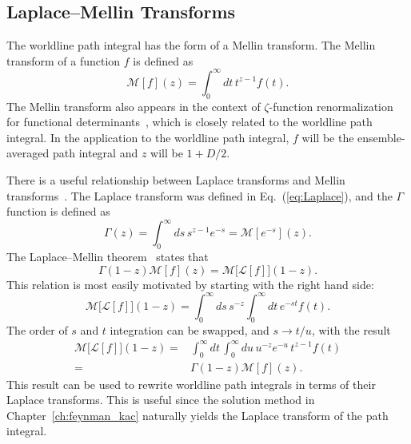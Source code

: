 \subsection{ Laplace--Mellin Transforms}

The worldline path integral has the form of a Mellin transform.  
The Mellin transform of a function $f$ is defined as 
\begin{equation}
\mathcal{M}[f](z)= \int_0^\infty dt\, t^{z-1}f(t).
\end{equation}
The Mellin transform also appears in the context of $\zeta$-function renormalization for functional determinants~\citep{Elizalde2008},
which is closely related to the worldline path integral.  
In the application to the worldline path integral, $f$ will be the ensemble-averaged path integral and $z$ will be $1+D/2$.

There is a useful relationship between Laplace transforms and Mellin transforms~\citep{Lew1975}.  
The Laplace transform was defined in Eq.~(\ref{eq:Laplace}), and the $\Gamma$ function is defined as  
\begin{equation}
\Gamma(z) = \int_0^\infty ds\, s^{z-1} e^{-s} = \mathcal{M}[e^{-s}](z).
\end{equation}
The Laplace--Mellin theorem~\citep{Lew1975} states that
\begin{equation}
  \Gamma(1-z)\mathcal{M}[f](z) = \mathcal{M}\big[\mathcal{L}[f]\big](1-z)\label{eq:Laplace--Mellin}.
\end{equation}
This relation is most easily motivated by starting with the right hand side:
\begin{equation}
\mathcal{M}\big[\mathcal{L}[f]\big](1-z) = 
\int_0^\infty ds\, s^{-z} \int_0^\infty dt\,e^{-st} f(t).
\end{equation}
The order of $s$ and $t$ integration can be swapped, and  $s\rightarrow t/u$, with the 
result
\begin{align}
\mathcal{M}\big[\mathcal{L}[f]\big](1-z)=&\int_0^\infty dt\,\int_0^\infty du\, u^{-z} e^{-u}\,t^{z-1} f(t) \\
=& \Gamma(1-z)\mathcal{M}[f](z).
\end{align}
This result can be used to rewrite worldline path integrals in terms of their Laplace transforms. 
This is useful since the solution method in Chapter~\ref{ch:feynman_kac} naturally yields the Laplace transform of the path integral.

